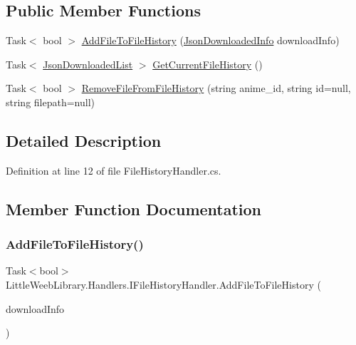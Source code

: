 \subsection*{Public Member Functions}
\begin{DoxyCompactItemize}
\item 
Task$<$ bool $>$ \mbox{\hyperlink{interface_little_weeb_library_1_1_handlers_1_1_i_file_history_handler_a61ccff04c662692b2ad3f67773c73918}{Add\+File\+To\+File\+History}} (\mbox{\hyperlink{class_little_weeb_library_1_1_models_1_1_json_downloaded_info}{Json\+Downloaded\+Info}} download\+Info)
\item 
Task$<$ \mbox{\hyperlink{class_little_weeb_library_1_1_models_1_1_json_downloaded_list}{Json\+Downloaded\+List}} $>$ \mbox{\hyperlink{interface_little_weeb_library_1_1_handlers_1_1_i_file_history_handler_a4c21e166d6be24e3378cdbbf938c4671}{Get\+Current\+File\+History}} ()
\item 
Task$<$ bool $>$ \mbox{\hyperlink{interface_little_weeb_library_1_1_handlers_1_1_i_file_history_handler_afcfb45f7f8a2161350d0b78c25a3d0d3}{Remove\+File\+From\+File\+History}} (string anime\+\_\+id, string id=null, string filepath=null)
\end{DoxyCompactItemize}


\subsection{Detailed Description}


Definition at line 12 of file File\+History\+Handler.\+cs.



\subsection{Member Function Documentation}
\mbox{\label{interface_little_weeb_library_1_1_handlers_1_1_i_file_history_handler_a61ccff04c662692b2ad3f67773c73918}} 
\subsubsection{\texorpdfstring{Add\+File\+To\+File\+History()}{AddFileToFileHistory()}}
{\footnotesize\ttfamily Task$<$bool$>$ Little\+Weeb\+Library.\+Handlers.\+I\+File\+History\+Handler.\+Add\+File\+To\+File\+History (\begin{DoxyParamCaption}\item[{\mbox{\hyperlink{class_little_weeb_library_1_1_models_1_1_json_downloaded_info}{Json\+Downloaded\+Info}}}]{download\+Info }\end{DoxyParamCaption})}



